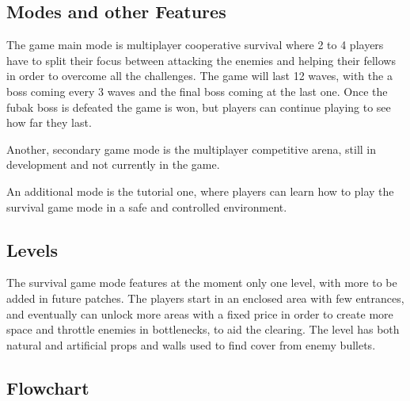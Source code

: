 \documentclass[12pt]{article}
\begin{document}
\subsection{Modes and other Features}

The game main mode is multiplayer cooperative survival where 2 to 4 players have to split their focus between attacking the enemies and helping their fellows in order to overcome all the challenges. The game will last 12 waves, with the a boss coming every 3 waves and the final boss coming at the last one. Once the fubak boss is defeated the game is won, but players can continue playing to see how far they last.

Another, secondary game mode is the multiplayer competitive arena, still in development and not currently in the game.

An additional mode is the tutorial one, where players can learn how to play the survival game mode in a safe and controlled environment.

\subsection{Levels}

The survival game mode features at the moment only one level, with more to be added in future patches. The players start in an enclosed area with few entrances, and eventually can unlock more areas with a fixed price in order to create more space and throttle enemies in bottlenecks, to aid the clearing. The level has both natural and artificial props and walls used to find cover from enemy bullets.

\subsection{Flowchart}
\end{document}
